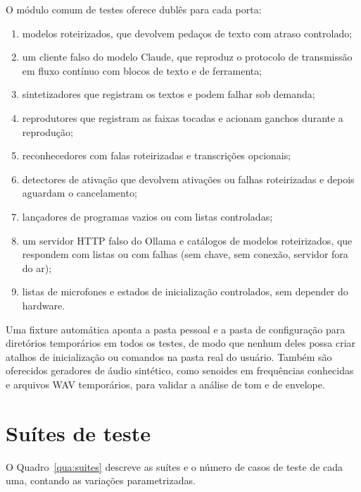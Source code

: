 O módulo comum de testes oferece dublês para cada porta:
\begin{enumerate}[label=\alph*)]
  \item modelos roteirizados, que devolvem pedaços de texto com atraso controlado;
  \item um cliente falso do modelo Claude, que reproduz o protocolo de transmissão em fluxo contínuo com
        blocos de texto e de ferramenta;
  \item sintetizadores que registram os textos e podem falhar sob demanda;
  \item reprodutores que registram as faixas tocadas e acionam ganchos durante a reprodução;
  \item reconhecedores com falas roteirizadas e transcrições opcionais;
  \item detectores de ativação que devolvem ativações ou falhas roteirizadas e depois aguardam o
        cancelamento;
  \item lançadores de programas vazios ou com listas controladas;
  \item um servidor HTTP falso do Ollama e catálogos de modelos roteirizados, que respondem com listas
        ou com falhas (sem chave, sem conexão, servidor fora do ar);
  \item listas de microfones e estados de inicialização controlados, sem depender do hardware.
\end{enumerate}
Uma fixture automática aponta a pasta pessoal e a pasta de configuração para diretórios temporários
em todos os testes, de modo que nenhum deles possa criar atalhos de inicialização ou comandos na pasta
real do usuário.
Também são oferecidos geradores de áudio sintético, como senoides em frequências conhecidas e arquivos
WAV temporários, para validar a análise de tom e de envelope.

\section{Suítes de teste}

O Quadro~\ref{qua:suites} descreve as suítes e o número de casos de teste de cada uma, contando as
variações parametrizadas.

